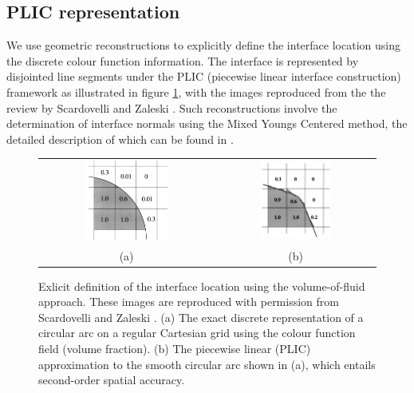 \subsection*{PLIC representation}
We use geometric reconstructions to explicitly define the 
interface location using the discrete colour function information. 
The interface is represented by disjointed line segments under 
the PLIC (piecewise linear interface construction)
framework as illustrated in figure \ref{vof_plic}, with the images reproduced 
from the the review by Scardovelli and Zaleski . 
Such reconstructions involve the determination of interface normals 
using the Mixed Youngs Centered method, the detailed description 
of which can be found in \cite{zaleskibook}. 

\begin{figure}[!h]
\begin{center}
\begin{tabular}{cc}
\hspace*{-1.0cm}
\includegraphics[width=0.5\textwidth]{plots/methodology/vof_basic.png} &
\hspace{-0.2cm}%
\includegraphics[width=0.473\textwidth]{plots/methodology/vof_plic.png} \\ 
\hspace{-0.2cm}%
(a) & (b) \\
\end{tabular}
\end{center}
\caption{ Exlicit definition of the interface location using the volume-of-fluid approach. 
These images are reproduced with permission from Scardovelli and Zaleski \cite{zaleskiannual}.
(a) The exact discrete representation of a circular arc on a regular Cartesian grid using the colour function field (volume fraction).
(b) The piecewise linear (PLIC) approximation to the smooth circular arc shown in (a), which entails second-order spatial accuracy.   
}
\label{vof_plic}
\end{figure}

